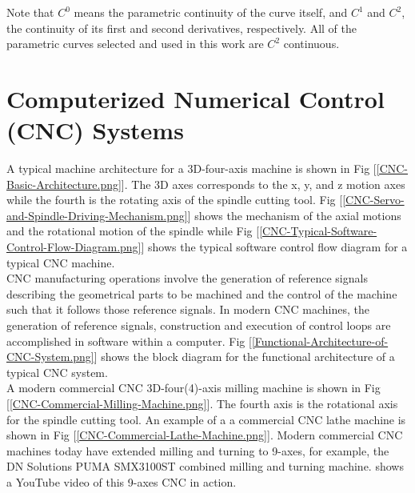Note that $C^{0}$ means the parametric continuity of the curve itself, and $C^{1}$ and $C^{2}$, the continuity of its first and second derivatives, respectively. All of the parametric curves selected and used in this work are $C^{2}$ continuous.

\clearpage
\pagebreak
\section{Computerized Numerical Control (CNC) Systems}

A typical machine architecture for a 3D-four-axis machine is shown in Fig [\ref{CNC-Basic-Architecture.png}]. The 3D axes corresponds to the x, y, and z motion axes while the fourth is the rotating axis of the spindle cutting tool. Fig [\ref{CNC-Servo-and-Spindle-Driving-Mechanism.png}] shows the mechanism of the axial motions and the rotational motion of the spindle while Fig [\ref{CNC-Typical-Software-Control-Flow-Diagram.png}] shows the typical software control flow diagram for a typical CNC machine.\\


CNC manufacturing operations involve the generation of reference signals describing the geometrical parts to be machined and the control of the machine such that it follows those reference signals. In modern CNC machines, the generation of reference signals, construction and execution of control loops are accomplished in software within a computer. Fig [\ref{Functional-Architecture-of-CNC-System.png}] shows the block diagram for the functional architecture of a typical CNC system.\\

A modern commercial CNC 3D-four(4)-axis milling machine is shown in Fig [\ref{CNC-Commercial-Milling-Machine.png}]. The fourth axis is the rotational axis for the spindle cutting tool. An example of a a commercial CNC lathe machine is shown in Fig [\ref{CNC-Commercial-Lathe-Machine.png}]. Modern commercial CNC machines today have extended milling and turning to 9-axes, for example, the DN Solutions PUMA SMX3100ST combined milling and turning machine. \cite{TitanCNC:2021} shows a YouTube video of this 9-axes CNC in action.\\


